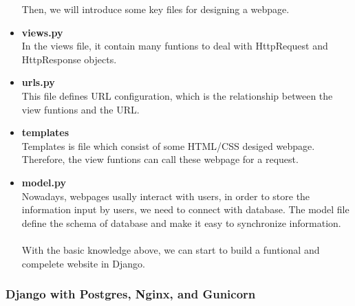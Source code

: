 \begin{itemize}
Then, we will introduce some key files for designing a webpage.
		
		\item \textbf{views.py}\\
			  In the views file, it contain many funtions to deal with HttpRequest and  HttpResponse objects.
		\item \textbf{urls.py}\\
			  This file defines URL configuration, which is the relationship between the view funtions and the URL.
		\item \textbf{templates}\\
			  Templates is file which consist of some HTML/CSS desiged webpage. Therefore, the view funtions can call these webpage for a request.
		\item \textbf{model.py}\\
			  Nowadays, webpages usally interact with users, in order to store the information input by users, we need to connect with database. The model file define the schema of database and make it easy to synchronize information.\\\\
With the basic knowledge above, we can start to build a funtional and compelete website in Django.
\end{itemize}
\subsubsection{Django with Postgres, Nginx, and Gunicorn}
